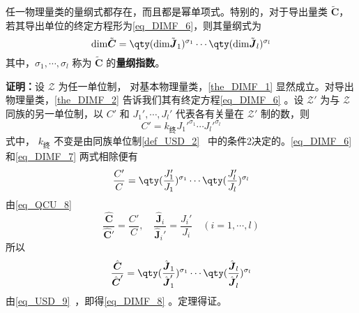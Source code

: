\begin{theorem}{}\label{the_DIMF_1}
任一物理量类的量纲式都存在，而且都是幂单项式。特别的，对于导出量类 $\tilde{\boldsymbol{C}}$，若其导出单位的终定方程形为\autoref{eq_DIMF_6}，则其量纲式为
\begin{equation}\label{eq_DIMF_8}
\mathrm{dim}\tilde{\boldsymbol{C}}=\qty(\mathrm{dim}\tilde{\boldsymbol{J}}_1)^{\sigma_1}\cdots\qty(\mathrm{dim}\tilde{\boldsymbol{J}}_l)^{\sigma_l}
\end{equation}
其中，$\sigma_1,\cdots,\sigma_l$ 称为 $\tilde{\boldsymbol{C}}$ 的\textbf{量纲指数}。
\end{theorem}
\textbf{证明：}设 $\mathscr{Z}$ 为任一单位制， 对基本物理量类，\autoref{the_DIMF_1} 显然成立。对导出物理量类，\autoref{the_DIMF_2} 告诉我们其有终定方程\autoref{eq_DIMF_6} 。设 $\mathscr{Z'}$ 为与 $\mathscr{Z}$ 同族的另一单位制，以 $C'$ 和 $J_1',\cdots,J_l'$ 代表各有关量在 $\mathscr{Z'}$ 制的数，则
\begin{equation}\label{eq_DIMF_7}
C'=k_{\text{终}}J_1'^{\sigma_1}\cdots J_l'^{\sigma_l}
\end{equation}
 式中， $k_{\text{终}}$ 不变是由同族单位制\autoref{def_USD_2}~ 中的条件2决定的。\autoref{eq_DIMF_6} 和\autoref{eq_DIMF_7} 两式相除便有
 \begin{equation}
 \frac{C'}{C}=\qty(\frac{J_1'}{J_1})^{\sigma_1}\cdots\qty(\frac{J_l'}{J_l})^{\sigma_l}
 \end{equation}
 由\autoref{eq_QCU_8}~
 \begin{equation}
 \frac{\hat{\boldsymbol{C}}}{\hat{\boldsymbol{C}}'}=\frac{C'}{C}, \quad\frac{\hat{\boldsymbol{J}}_i}{\hat{\boldsymbol{J}}_i'}=\frac{J_i'}{J_i}\quad (i=1,\cdots ,l)
 \end{equation}
 所以
 \begin{equation}
 \frac{\hat{\boldsymbol{C}}}{\hat{\boldsymbol{C}}'}=\qty(\frac{\hat{\boldsymbol{J}}_1}{\hat{\boldsymbol{J}}_1'})^{\sigma_1}\cdots\qty(\frac{\hat{\boldsymbol{J}}_l}{\hat{\boldsymbol{J}}_l'})^{\sigma_l}
 \end{equation}
 由\autoref{eq_USD_9}~，即得\autoref{eq_DIMF_8} 。定理得证。

